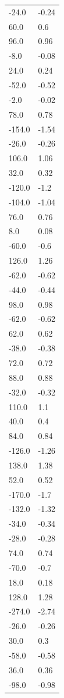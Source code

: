 \begin{longtable}{ll}
-24.0 & -0.24 \\
60.0 & 0.6 \\
96.0 & 0.96 \\
-8.0 & -0.08 \\
24.0 & 0.24 \\
-52.0 & -0.52 \\
-2.0 & -0.02 \\
78.0 & 0.78 \\
-154.0 & -1.54 \\
-26.0 & -0.26 \\
106.0 & 1.06 \\
32.0 & 0.32 \\
-120.0 & -1.2 \\
-104.0 & -1.04 \\
76.0 & 0.76 \\
8.0 & 0.08 \\
-60.0 & -0.6 \\
126.0 & 1.26 \\
-62.0 & -0.62 \\
-44.0 & -0.44 \\
98.0 & 0.98 \\
-62.0 & -0.62 \\
62.0 & 0.62 \\
-38.0 & -0.38 \\
72.0 & 0.72 \\
88.0 & 0.88 \\
-32.0 & -0.32 \\
110.0 & 1.1 \\
40.0 & 0.4 \\
84.0 & 0.84 \\
-126.0 & -1.26 \\
138.0 & 1.38 \\
52.0 & 0.52 \\
-170.0 & -1.7 \\
-132.0 & -1.32 \\
-34.0 & -0.34 \\
-28.0 & -0.28 \\
74.0 & 0.74 \\
-70.0 & -0.7 \\
18.0 & 0.18 \\
128.0 & 1.28 \\
-274.0 & -2.74 \\
-26.0 & -0.26 \\
30.0 & 0.3 \\
-58.0 & -0.58 \\
36.0 & 0.36 \\
-98.0 & -0.98 \\

\end{longtable}
